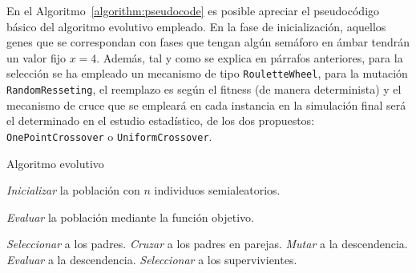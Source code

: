 En el Algoritmo~\ref{algorithm:pseudocode} es posible apreciar el pseudocódigo básico del algoritmo evolutivo empleado. En la fase de inicialización, aquellos genes que se correspondan con fases que tengan algún semáforo en ámbar tendrán un valor fijo $x=4$. Además, tal y como se explica en párrafos anteriores, para la selección se ha empleado un mecanismo de tipo \texttt{RouletteWheel}, para la mutación \texttt{RandomResseting}, el reemplazo es según el fitness (de manera determinista) y el mecanismo de cruce que se empleará en cada instancia en la simulación final será el determinado en el estudio estadístico, de los dos propuestos: \texttt{OnePointCrossover} o \texttt{UniformCrossover}.

\begin{algorithm}
    \caption{Algoritmo evolutivo}
    \label{algorithm:pseudocode}
    
    \begin{algorithmic}[1]
        \State \textit{Inicializar} la población con $n$ individuos semialeatorios.
        
        \State \textit{Evaluar} la población mediante la función objetivo.
        
            \State \textit{Seleccionar} a los padres. 
            \State \textit{Cruzar} a los padres en parejas. 
            \State \textit{Mutar} a la descendencia. 
            \State \textit{Evaluar} a la descendencia.
            \State \textit{Seleccionar} a los supervivientes.  
        \EndWhile
    \end{algorithmic}
\end{algorithm}

